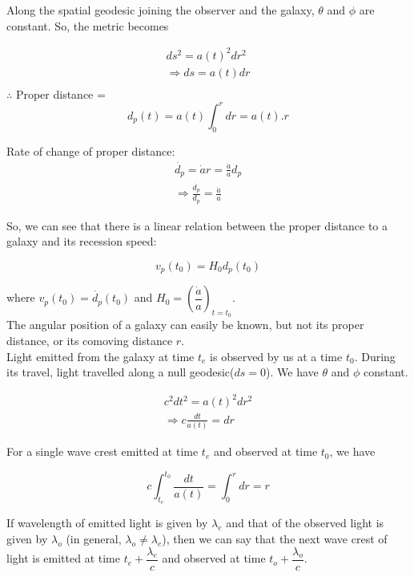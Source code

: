 \documentclass[a4,12pt,oneside]{report}
\begin{document}
	Along the spatial geodesic joining the observer and the galaxy, $ \theta $ and $ \phi $ are constant. So, the metric becomes
	
	\begin{align}
		ds^2=a(t)^2dr^2 \\
		\Rightarrow ds=a(t)dr \\
	\end{align}
	$\therefore$ Proper distance =\[d_p(t)=a(t)\int_0^r dr= a(t).r  \]
	
	Rate of change of proper distance:
	\begin{align}
		\dot{d_p}=\dot{a} r = \frac{\dot{a}}{a}d_p \\
		\Rightarrow \frac{\dot{d_p}}{d_p}=\frac{\dot{a}}{a}
	\end{align}
	
	So, we can see that there is a linear relation between the proper distance to a galaxy and its recession speed:
	
	\begin{equation}
		v_p(t_0)=H_0d_p(t_0)
	\end{equation}
	
	where $v_p(t_0)=\dot{d_p}(t_0)$ and $ H_0=\left(\dfrac{\dot{a}}{a}\right)_{t=t_0} $. \\
	
	
	The angular position of a galaxy can easily be known, but not its proper distance, or its comoving distance $ r $. \\
	
	Light emitted from the galaxy at time $ t_e $ is observed by us at a time $ t_0 $. During its travel, light travelled along a null geodesic($ ds=0 $). We have $ \theta $ and $ \phi $ constant.
	
	\begin{align}
		c^2dt^2=a(t)^2dr^2 \\
		\Rightarrow c\frac{dt}{a(t)}=dr
	\end{align}
	
	For a single wave crest emitted at time $ t_e $ and observed at time $ t_0 $, we have
	
	\begin{equation}
		c\int_{t_e}^{t_0} \frac{dt}{a(t)} = \int_0^r dr = r
	\end{equation}
	
	If wavelength of emitted light is given by $ \lambda_e $ and that of the observed light is given by $ \lambda_o $ (in general, $ \lambda_o \neq \lambda_e $), then we can say that the next wave crest of light is emitted at time $ t_e+\dfrac{\lambda_e}{c} $ and observed at time $ t_o + \dfrac{\lambda_o}{c} $.
	
\end{document}
